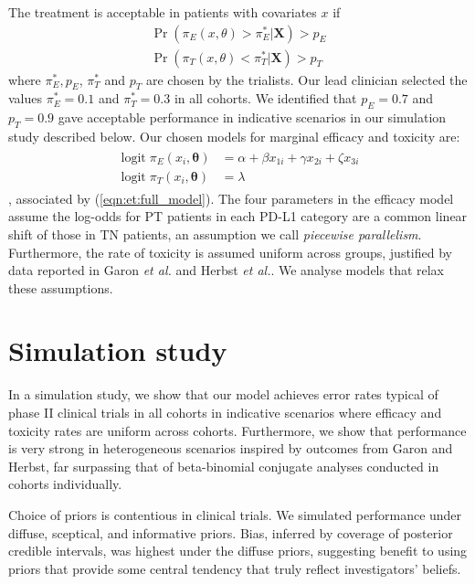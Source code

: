 \documentclass[graybox]{svmult}
\DeclareMathOperator{\logit}{logit}
\begin{document}
The treatment is acceptable in patients with covariates $x$ if
\begin{equation}
\label{eqn:bebop:acceptance}
\begin{split}
\Pr(\pi_E(x, \theta) > \pi_E^* | \boldsymbol{X}) > p_E \\
\Pr(\pi_T(x, \theta) < \pi_T^* | \boldsymbol{X}) > p_T
\end{split}
\end{equation}
where $\pi_E^*, p_E$, $\pi_T^*$ and $p_T$ are chosen by the trialists.
Our lead clinician selected the values $\pi_E^* = 0.1$ and $\pi_T^* = 0.3$ in all cohorts.
We identified that $p_E = 0.7$ and $p_T = 0.9$ gave acceptable performance in indicative scenarios in our simulation study described below.
Our chosen models for marginal efficacy and toxicity are:
\begin{align}
	\label{eqn:bebop:logit}
	\begin{split}
		\logit \pi_E(x_i, \boldsymbol{\theta}) & = \alpha + \beta x_{1i} + \gamma x_{2i} + \zeta x_{3i} \\
		\logit \pi_T(x_i, \boldsymbol{\theta}) & = \lambda
	\end{split}
\end{align}
, associated by (\ref{eqn:et:full_model}).
The four parameters in the efficacy model assume the log-odds for PT patients in each PD-L1 category are a common linear shift of those in TN patients, an assumption we call \textit{piecewise parallelism}.
Furthermore, the rate of toxicity is assumed uniform across groups, justified by data reported in Garon \textit{et al.} and Herbst \textit{et al.}\cite{Herbst2016}.
We analyse models that relax these assumptions.

\section{Simulation study}
In a simulation study, we show that our model achieves error rates typical of phase II clinical trials in all cohorts in indicative scenarios where efficacy and toxicity rates are uniform across cohorts.
Furthermore, we show that performance is very strong in heterogeneous scenarios inspired by outcomes from Garon\cite{Garon2015} and Herbst\cite{Herbst2016}, far surpassing that of beta-binomial conjugate analyses conducted in cohorts individually. 

Choice of priors is contentious in clinical trials.
We simulated performance under diffuse, sceptical, and informative priors. 
Bias, inferred by coverage of posterior credible intervals, was highest under the diffuse priors, suggesting benefit to using priors that provide some central tendency that truly reflect investigators' beliefs.
\end{document}
